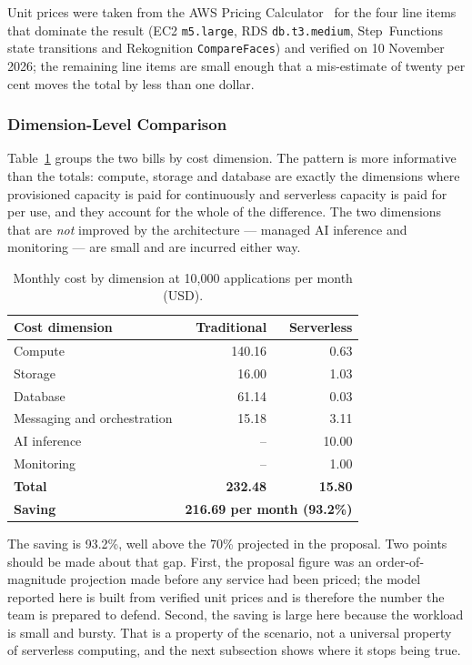 Unit prices were taken from the AWS Pricing Calculator~\cite{aws2026pricing} for the four line items
that dominate the result (EC2 \texttt{m5.large}, RDS \texttt{db.t3.medium},
Step~Functions state transitions and Rekognition \texttt{CompareFaces}) and
verified on 10 November 2026; the remaining line items are small enough that a
mis-estimate of twenty per cent moves the total by less than one dollar.

\subsubsection{Dimension-Level Comparison}\label{sec:cost:comparison}

Table~\ref{tab:tco} groups the two bills by cost dimension. The pattern is more
informative than the totals: compute, storage and database are exactly the
dimensions where provisioned capacity is paid for continuously and serverless
capacity is paid for per use, and they account for the whole of the difference.
The two dimensions that are \emph{not} improved by the architecture --- managed
AI inference and monitoring --- are small and are incurred either way.

\begin{table}[htbp]
  \centering
  \small
  \caption{Monthly cost by dimension at 10{,}000 applications per month (USD).}
  \label{tab:tco}
  \begin{tabular}{@{}lrr@{}}
    \toprule
    Cost dimension & Traditional & Serverless \\
    \midrule
    Compute                     & 140.16 &  0.63 \\
    Storage                     &  16.00 &  1.03 \\
    Database                    &  61.14 &  0.03 \\
    Messaging and orchestration &  15.18 &  3.11 \\
    AI inference                &     -- & 10.00 \\
    Monitoring                  &     -- &  1.00 \\
    \midrule
    \textbf{Total}              & \textbf{232.48} & \textbf{15.80} \\
    \textbf{Saving}             & \multicolumn{2}{c}{\textbf{216.69 per month (93.2\%)}} \\
    \bottomrule
  \end{tabular}
\end{table}

The saving is 93.2\%, well above the 70\% projected in the proposal. Two points
should be made about that gap. First, the proposal figure was an
order-of-magnitude projection made before any service had been priced; the model
reported here is built from verified unit prices and is therefore the number the
team is prepared to defend. Second, the saving is large here because the workload
is small and bursty. That is a property of the scenario, not a universal property
of serverless computing, and the next subsection shows where it stops being true.

